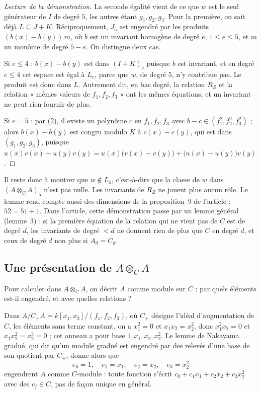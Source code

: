 \documentclass[11pt,a4paper]{amsart}
\theoremstyle{definition}
\theoremstyle{plain}
\theoremstyle{remark}
\begin{document}
\begin{proof}[Lecture de la démonstration]
La seconde égalité vient de ce que $w$ est le seul générateur de $I$ de degré $5$, les autres étant $g_1, g_2, g_3$. Pour la première, on sait déjà $L \subseteq J + K$. Réciproquement, $J_5$ est engendré par les produits $(b(x) - b(y))\,m$, où $b$ est un invariant homogène de degré $e$, $1 \le e \le 5$, et $m$ un monôme de degré $5 - e$. On distingue deux cas.

Si $e \le 4$ : $b(x) - b(y)$ est dans $(I + K)_e$ puisque $b$ est invariant, et en degré $e \le 4$ cet espace est égal à $L_e$, parce que $w$, de degré $5$, n'y contribue pas. Le produit est donc dans $L$. Autrement dit, en bas degré, la relation $R_Z$ et la relation « mêmes valeurs de $f_1, f_2, f_3$ » ont les mêmes équations, et un invariant ne peut rien fournir de plus.

Si $e = 5$ : par (2), il existe un polynôme $c$ en $f_1, f_2, f_3$ avec $b - c \in (f_1^2, f_2^2, f_3^2)$ ; alors $b(x) - b(y)$ est congru modulo $K$ à $c(x) - c(y)$, qui est dans $(g_1, g_2, g_3)$, puisque $u(x)v(x) - u(y)v(y) = u(x)\bigl(v(x) - v(y)\bigr) + \bigl(u(x) - u(y)\bigr)v(y)$.
\end{proof}

Il reste donc à montrer que $w \notin L_5$, c'est-à-dire que la classe de $w$ dans $(A \otimes_C A)_5$ n'est pas nulle. Les invariants de $R_Z$ ne jouent plus aucun rôle. Le lemme rend compte aussi des dimensions de la proposition~9 de l'article : $52 = 51 + 1$. Dans l'article, cette démonstration passe par un lemme général (lemme~3) : si la première équation de la relation qui ne vient pas de $C$ est de degré $d$, les invariants de degré $< d$ ne donnent rien de plus que $C$ en degré $d$, et ceux de degré $d$ non plus si $A_d = C_d$.

\subsection{Une présentation de $A \otimes_C A$}

Pour calculer dans $A \otimes_C A$, on décrit $A$ comme module sur $C$ : par quels éléments est-il engendré, et avec quelles relations ?

Dans $A/C_+A = k[x_1, x_2]/(f_1, f_2, f_3)$, où $C_+$ désigne l'idéal d'augmentation de $C$, les éléments sans terme constant, on a $x_1^2 = 0$ et $x_1x_2 = x_2^2$, donc $x_1^2x_2 = 0$ et $x_1x_2^2 = x_2^3 = 0$ ; cet anneau a pour base $1, x_1, x_2, x_2^2$. Le lemme de Nakayama gradué, qui dit qu'un module gradué est engendré par des relevés d'une base de son quotient par $C_+$, donne alors que
\[
e_0 = 1, \quad e_1 = x_1, \quad e_2 = x_2, \quad e_3 = x_2^2
\]
engendrent $A$ comme $C$-module : toute fonction s'écrit $c_0 + c_1x_1 + c_2x_2 + c_3x_2^2$ avec des $c_j \in C$, pas de façon unique en général.
\end{document}
